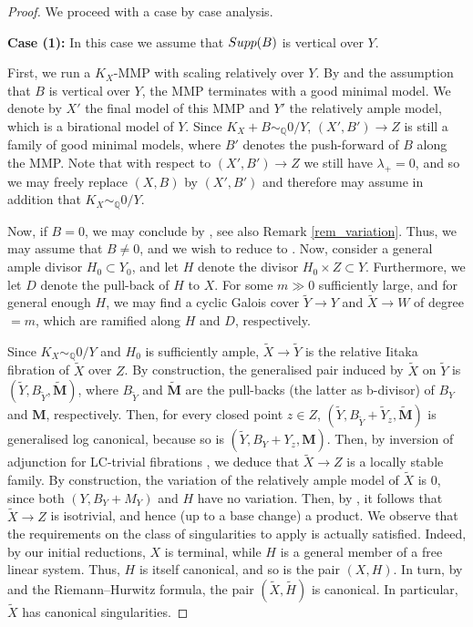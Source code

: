 \documentclass[12pt]{amsart}
\theoremstyle{plain}
\theoremstyle{definition}
\def\QQ{\mathbb Q}
\def\rar{\rightarrow}
\begin{document}
\begin{proof}
 
We proceed with a case by case analysis.

{\bf Case (1):} In this case we assume that ${\rm Supp}(B)$ is vertical over $Y$. 

First, we run a $K_X$-MMP with scaling relatively over $Y$.
By \cite[Theorem 1.1]{HX11} and the assumption that $B$ is vertical over $Y$, the 
MMP terminates with a good minimal model.
We denote by $X'$ the final model of this MMP and $Y'$ the relatively ample model, which is a birational model of $Y$.
Since $K_X+B\sim_{\QQ}0/Y$, $(X',B') \rar Z$ is still a family of good minimal models, 
where $B'$ denotes the push-forward of $B$ along the MMP.  Note that with respect to $(X', B') \rightarrow Z$ 
we still have $\lambda_+ = 0$, and so we may freely replace $(X, B)$ by $(X', B')$ and therefore may assume
in addition that $K_X \sim_{\mathbb Q} 0/Y$. 



Now, if $B = 0$, we may conclude by \cite[Theorem 1.1]{Kawamata85a}, see also Remark \ref{rem_variation}.
Thus, we may assume that $B \neq 0$, and we wish to reduce to \cite{Kawamata85a}.
Now, consider a general ample divisor $H_0 \subset Y_0$, and let $H$ denote 
the divisor $H_0 \times Z \subset Y$.
Furthermore, we let $D$ denote the pull-back of $H$ to $X$.
For some $m \gg 0$ sufficiently large, and for general enough $H$,
we may find a cyclic Galois cover 
$\tilde{Y} \rightarrow Y$ and $\tilde{X} \rightarrow W$
of degree $=m$, which are ramified along $H$ and $D$, respectively.



Since $K_X \sim_{\QQ} 0 /Y$ and $H_0$ is sufficiently ample, 
$\tilde{X} \rar \tilde{Y}$ is the relative Iitaka fibration of $\tilde{X}$ over $Z$.
By construction, the generalised pair induced by $\tilde{X}$ on $\tilde{Y}$ is
$(\tilde Y,B_{\tilde{Y}},\tilde{\mathbf{M}})$, where $B_{\tilde{Y}}$ and $\tilde{\mathbf{M}}$ are the pull-backs
(the latter as b-divisor) of $B_Y$ and $\mathbf{M}$, respectively.
Then, for every closed point $z \in Z$, $(\tilde{Y}, B_{\tilde{Y}}+\tilde{Y}_z,\tilde{\mathbf{M}})$
is generalised log canonical, because so is $(\tilde Y, B_{ Y}+ Y _z,{\mathbf{M}})$.
Then, by inversion of adjunction for LC-trivial fibrations \cite[Theorem~3.1]{Ambro04},
we deduce that $\tilde{X} \rar Z$ is a locally stable family.
By construction, the variation of the relatively ample model of $\tilde{X}$ is 0, 
since both $(Y,B_Y+M_Y)$ and $H$ have no variation.
Then, by \cite[Theorem 1.1]{Kawamata85a}, it follows that $\tilde{X} \rar Z$ is isotrivial, and hence (up to a base change)
a product.
We observe that the requirements on the class of singularities to apply \cite[Theorem 1.1]{Kawamata85a} is actually satisfied.
Indeed, by our initial reductions, $X$ is terminal, while $H$ is a general member of a free linear system.
Thus, $H$ is itself canonical, and so is the pair $(X,H)$.
In turn, by \cite[Proposition~5.20]{KM98} and the Riemann--Hurwitz formula, the pair $(\tilde X, \tilde H)$ is canonical.
In particular, $\tilde X$ has canonical singularities.



\end{proof}
\end{document}
